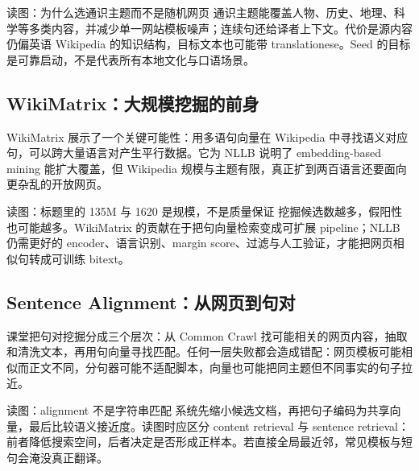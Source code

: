 
\begin{knowledgebox}{读图：为什么选通识主题而不是随机网页}
通识主题能覆盖人物、历史、地理、科学等多类内容，并减少单一网站模板噪声；连续句还给译者上下文。代价是源内容仍偏英语 Wikipedia 的知识结构，目标文本也可能带 translationese。Seed 的目标是可靠启动，不是代表所有本地文化与口语场景。
\end{knowledgebox}


\subsection{WikiMatrix：大规模挖掘的前身}

WikiMatrix 展示了一个关键可能性：用多语句向量在 Wikipedia 中寻找语义对应句，可以跨大量语言对产生平行数据。它为 NLLB 说明了 embedding-based mining 能扩大覆盖，但 Wikipedia 规模与主题有限，真正扩到两百语言还要面向更杂乱的开放网页。


\begin{knowledgebox}{读图：标题里的 135M 与 1620 是规模，不是质量保证}
挖掘候选数越多，假阳性也可能越多。WikiMatrix 的贡献在于把句向量检索变成可扩展 pipeline；NLLB 仍需更好的 encoder、语言识别、margin score、过滤与人工验证，才能把网页相似句转成可训练 bitext。
\end{knowledgebox}

\subsection{Sentence Alignment：从网页到句对}

课堂把句对挖掘分成三个层次：从 Common Crawl 找可能相关的网页内容，抽取和清洗文本，再用句向量寻找匹配。任何一层失败都会造成错配：网页模板可能相似而正文不同，分句器可能不适配脚本，向量也可能把同主题但不同事实的句子拉近。


\begin{knowledgebox}{读图：alignment 不是字符串匹配}
系统先缩小候选文档，再把句子编码为共享向量，最后比较语义接近度。读图时应区分 content retrieval 与 sentence retrieval：前者降低搜索空间，后者决定是否形成正样本。若直接全局最近邻，常见模板与短句会淹没真正翻译。
\end{knowledgebox}

